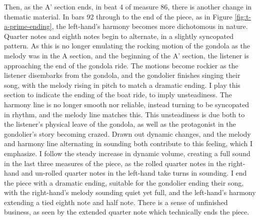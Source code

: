 Then, as the A' section ends, in beat 4 of measure 86, there is another change in thematic material. In bars 92 through to the end of the piece, as in Figure \ref{fig:t-a-prime-ending}\autocite{Henle_2002}, the left-hand's harmony becomes more dichotomous in nature. Quarter notes and eighth notes begin to alternate, in a slightly syncopated pattern. As this is no longer emulating the rocking motion of the gondola as the melody was in the A section, and the beginning of the A' section, the listener is approaching the end of the gondola ride. The motions become rockier as the listener disembarks from the gondola, and the gondolier finishes singing their song, with the melody rising in pitch to match a dramatic ending. I play this section to indicate the ending of the boat ride, to imply unsteadiness. The harmony line is no longer smooth nor reliable, instead turning to be syncopated in rhythm, and the melody line matches this. This unsteadiness is due both to the listener's physical leave of the gondola, as well as the protagonist in the gondolier's story becoming crazed. Drawn out dynamic changes, and the melody and harmony line alternating in sounding both contribute to this feeling, which I emphasize. I follow the steady increase in dynamic volume, creating a full sound in the last three measures of the piece, as the rolled quarter notes in the right-hand and un-rolled quarter notes in the left-hand take turns in sounding. I end the piece with a dramatic ending, suitable for the gondolier ending their song, with the right-hand's melody sounding quiet yet full, and the left-hand's harmony extending a tied eighth note and half note. There is a sense of unfinished business, as seen by the extended quarter note which technically ends the piece. 
